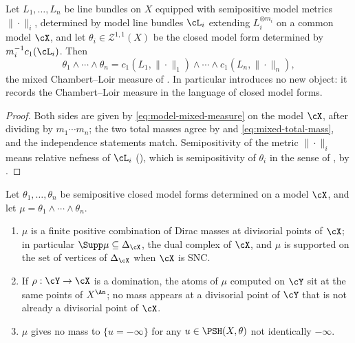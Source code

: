 \begin{corollary}
\label{cor:ch24-cl-identification}
Let \(L_1,\ldots,L_n\) be line bundles on \(X\) equipped with semipositive
model metrics \(\|\cdot\|_i\), determined by model line bundles \(\cL_i\)
extending \(L_i^{\otimes m_i}\) on a common model \(\cX\), and let
\(\theta_i\in\mathcal Z^{1,1}(X)\) be the closed model form determined by
\(m_i^{-1}c_1(\cL_i)\).  Then
\[
 \theta_1\wedge\cdots\wedge\theta_n
 =c_1(L_1,\|\cdot\|_1)\wedge\cdots\wedge c_1(L_n,\|\cdot\|_n),
\]
the mixed Chambert--Loir measure of .  In
particular  introduces no new object: it
records the Chambert--Loir measure in the language of closed model forms.
\end{corollary}

\begin{proof}
Both sides are given by \eqref{eq:model-mixed-measure} on the model \(\cX\),
after dividing by \(m_1\cdots m_n\); the two total masses agree by
 and \eqref{eq:mixed-total-mass}, and the
independence statements match.  Semipositivity of the metric \(\|\cdot\|_i\)
means relative nefness of \(\cL_i\)
(), which is semipositivity of \(\theta_i\)
in the sense of , by
.
\end{proof}

\begin{proposition}
\label{prop:ch24-model-support}
Let \(\theta_1,\ldots,\theta_n\) be semipositive closed model forms
determined on a model \(\cX\), and let
\(\mu=\theta_1\wedge\cdots\wedge\theta_n\).
\begin{enumerate}
\item\label{itm:ch24-ms:atomic} \(\mu\) is a finite positive combination of
 Dirac masses at divisorial points of \(\cX\); in particular
 \(\Supp\mu\subseteq\Delta_{\cX}\), the dual complex of \(\cX\), and
 \(\mu\) is supported on the set of vertices of \(\Delta_{\cX}\) when
 \(\cX\) is SNC.
\item\label{itm:ch24-ms:refine} If \(\rho:\cY\to\cX\) is a domination, the
 atoms of \(\mu\) computed on \(\cY\) sit at the same points of
 \(X^{\An}\); no mass appears at a divisorial point of \(\cY\) that is not
 already a divisorial point of \(\cX\).
\item\label{itm:ch24-ms:pluripolar} \(\mu\) gives no mass to
 \(\{u=-\infty\}\) for any \(u\in\PSH(X,\theta)\) not identically
 \(-\infty\).
\end{enumerate}
\end{proposition}


